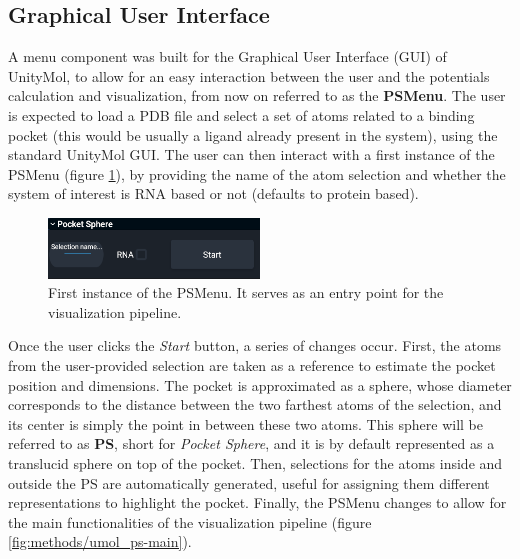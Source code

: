   \subsection{Graphical User Interface}
    A menu component was built for the Graphical User Interface (GUI) of UnityMol, to allow for an easy interaction between the user and the potentials calculation and visualization, from now on referred to as the \textbf{PSMenu}. The user is expected to load a PDB file and select a set of atoms related to a binding pocket (this would be usually a ligand already present in the system), using the standard UnityMol GUI. The user can then interact with a first instance of the PSMenu (figure \ref{fig:methods/umol_ps-start}), by providing the name of the atom selection and whether the system of interest is RNA based or not (defaults to protein based).

    \begin{figure}[H]
      \centering
      \includegraphics[width=0.5\textwidth]{figures/methods/umol_ps-start.png}
      \caption{\label{fig:methods/umol_ps-start} First instance of the PSMenu. It serves as an entry point for the visualization pipeline.}
    \end{figure}

    Once the user clicks the \textit{Start} button, a series of changes occur. First, the atoms from the user-provided selection are taken as a reference to estimate the pocket position and dimensions. The pocket is approximated as a sphere, whose diameter corresponds to the distance between the two farthest atoms of the selection, and its center is simply the point in between these two atoms. This sphere will be referred to as \textbf{PS}, short for \textit{Pocket Sphere}, and it is by default represented as a translucid sphere on top of the pocket. Then, selections for the atoms inside and outside the PS are automatically generated, useful for assigning them different representations to highlight the pocket. Finally, the PSMenu changes to allow for the main functionalities of the visualization pipeline (figure \ref{fig:methods/umol_ps-main}).

